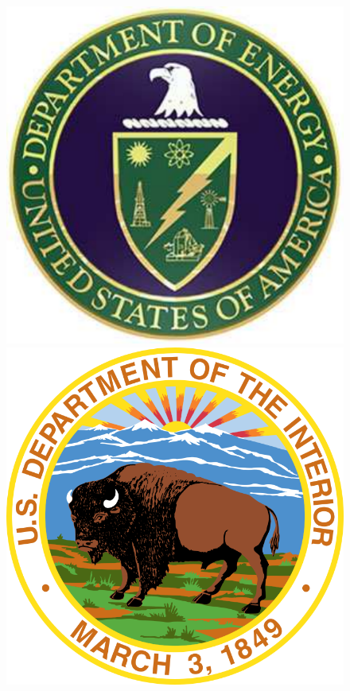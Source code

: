 \begin{frame}
\begin{figure}
\begin{center}
   \hfill
   \includegraphics[width=0.15\textheight]{logos/DOE_Logo}
   \hfill
   \includegraphics[width=0.15\textheight]{logos/DOI_Logo}
  \end{center}

\end{figure}
\end{frame}
